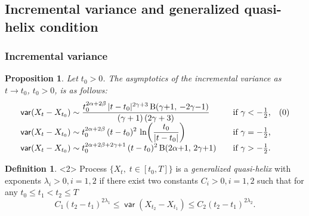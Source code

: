 \documentclass{beamer}
\DeclareMathOperator{\var}{\mathsf{var}}
\theoremstyle{plain}
\newtheorem{proposition}{Proposition}
\theoremstyle{definition}
\newtheorem{defn}{Definition}
\theoremstyle{remark}
\begin{document}
\subsection{Incremental variance and generalized quasi-helix condition}
\begin{frame}
	\frametitle{Incremental variance}
\begin{proposition}\label{prop:localvar}
Let $t_0 > 0$.
The asymptotics of the incremental variance as $t\to t_0$,
$t_0>0$,
is as follows:
\begin{equation*}
\begin{array}{l@{\qquad}l}
\displaystyle \var(X_{t}-X_{t_0}) \sim \frac
{t_0^{2\alpha+2\beta} \, |t - t_0|^{2\gamma+3} \,
\mathrm{B}(\gamma{+}1,\, {-}2\gamma{-}1)} {(\gamma + 1)\,(2\gamma
+ 3)}
& \mbox{if $\gamma<-\frac12$,}
\quad (\theequation) \\
\displaystyle \var(X_{t}-X_{t_0}) \sim t_0^{2\alpha+2\beta} \,
(t - t_0)^2 \, \ln\!\left( \frac{t_0}{|t - t_0|} \right)
& \mbox{if $\gamma=-\frac12$,} \\
\displaystyle \var(X_{t}-X_{t_0}) \sim
t_0^{2\alpha+2\beta+2\gamma+1} \, (t - t_0)^2 \,
\mathrm{B}(2\alpha{+}1,\, 2\gamma{+}1) & \mbox{if
$\gamma>-\frac12$.}
\end{array}
\end{equation*}
\end{proposition}
\begin{defn}<2>
Process $\{X_t, \; t\mathbin{\in}[t_0,T]\}$
is a \textit{generalized  quasi-helix\/}  with
exponents $\lambda_i>0, i=1,2$   if there exist two constants $C_i>0, i=1,2$ such that for any
$t_0  \le  t_1 < t_2  \le  T$
\[
C_1 (t_2-t_1)^{2\lambda_1} \le \var(X_{t_2} - X_{t_1}) \le
C_2 (t_2-t_1)^{2\lambda_2}.
\]
\end{defn}

\end{frame}
\end{document}
